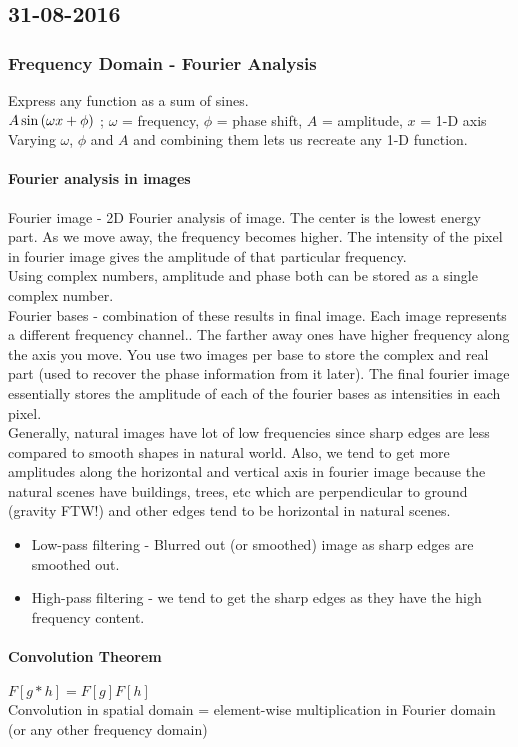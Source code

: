 \subsection{31-08-2016}
\subsubsection{Frequency Domain - Fourier Analysis}
 Express any function as a sum of sines.\\
 $A \sin{(\omega x+ \phi)}$ ; $\omega$ = frequency, $\phi$ = phase shift, $A$ = amplitude, $x$ = 1-D axis\\
 Varying $\omega$, $\phi$ and $A$ and combining them lets us recreate any 1-D function.
 
 \paragraph{Fourier analysis in images}
 Fourier image - 2D Fourier analysis of image. The center is the lowest energy part. As we move away, the frequency becomes higher. The intensity of the pixel in fourier image gives the amplitude of that particular frequency.\\
Using complex numbers, amplitude and phase both can be stored as a single complex number.\\

Fourier bases - combination of these results in final image. Each image represents a different frequency channel.. The farther away ones have higher frequency along the axis you move. You use two images per base to store the complex and real part (used to recover the phase information from it later). The final fourier image essentially stores the amplitude of each of the fourier bases as intensities in each pixel.\\
Generally, natural images have lot of low frequencies since sharp edges are less compared to smooth shapes in natural world. Also, we tend to get more amplitudes along the horizontal and vertical axis in fourier image because the natural scenes have buildings, trees, etc which are perpendicular to ground (gravity FTW!) and other edges tend to be horizontal in natural scenes.\\
\begin{itemize}
\item Low-pass filtering - Blurred out (or smoothed) image as sharp edges are smoothed out.
\item High-pass filtering - we tend to get the sharp edges as they have the high frequency content.
\end{itemize}
\paragraph{Convolution Theorem}
$F[g*h] = F[g]F[h]$\\
Convolution in spatial domain = element-wise multiplication in Fourier domain (or any other frequency domain)